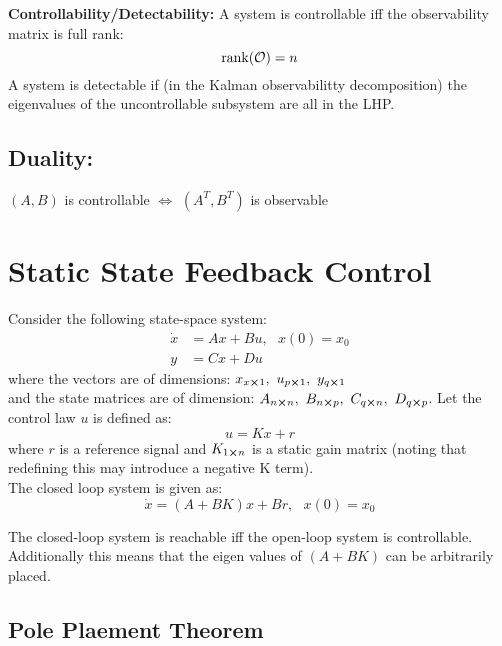\documentclass[]{article}
\newcommand{\obsv}{\mathcal{O}}
\begin{document}
		\textbf{Controllability/Detectability:}
		A system is controllable iff the observability matrix is full rank:
		\begin{displaymath}
			\rank(\obsv) = n
		\end{displaymath}
		A system is detectable if (in the Kalman observabilitty decomposition) the eigenvalues of the uncontrollable subsystem are all in the LHP.
	
	\subsection*{Duality:}
		\begin{center}
			$(A,B)$ is controllable $\iff$ $(A^T,B^T)$ is observable
		\end{center}


\section*{Static State Feedback Control}
	Consider the following state-space system:
	\begin{align*}
		\dot{x}	&= A x + B u, \ \ \ x(0)=x_0\\
		y		&= C x + D u
	\end{align*}
	where the vectors are of dimensions: $x_{x\cross1},\ u_{p\cross1},\ y_{q\cross1}$\\
	and the state matrices are of dimension: $A_{n \cross n},\ B_{n \cross p},\ C_{q\cross n},\ D_{q\cross p}$.
	Let the control law $u$ is defined as:
	\begin{displaymath}
		u = Kx + r
	\end{displaymath}
	where $r$ is a reference signal and $K_{1\cross n}$ is a static gain matrix (noting that redefining this may introduce a negative K term).\\
	The closed loop system is given as:
	\begin{displaymath}
		\dot{x} = (A+BK)x + B r, \ \ \ x(0) = x_0
	\end{displaymath}
	
	The closed-loop system is reachable iff the open-loop system is controllable. Additionally this means that the eigen values of $(A+BK)$ can be arbitrarily placed.\\
		

	\subsection*{Pole Plaement Theorem}
\end{document}

